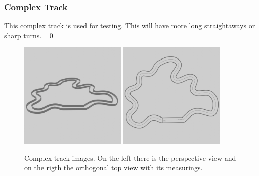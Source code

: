 \documentclass[14pt]{extarticle}
\newcounter{debug}
\begin{document}
\begin{flushleft}
	\subsubsection{Complex Track}
	This complex track is used for testing. This will have more long straightaways or sharp turns.
	\ifnum\value{debug}=0 {
	\begin{figure}[H]
    		\centering\includegraphics[width=0.45\textwidth]{./Image/Environment/Med/perspective.png}
			\centering\includegraphics[width=0.45\textwidth]{./Image/Environment/Med/top_w_line_mod.png}
    		
		\vspace{5mm}
		\caption{Complex track images. On the left there is the perspective view and on the rigth the orthogonal top view with its measurings.}
	\end{figure}
	}\fi
	

\end{flushleft}
\end{document}
